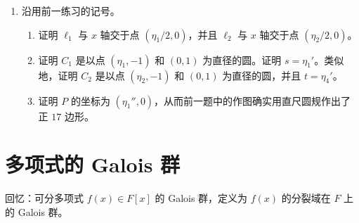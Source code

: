 \begin{enumerate}[label=\arabic*.]
\begin{enumerate}[label=(\alph*)]
\item 在点 $A$ 处作 $x$ 轴的垂线，并把从 $(0,0)$ 到 $B$ 的距离 $t$ 标出，从而作出点 $(s,t)$。作以 $(s,t)$ 和 $(0,1)$ 为直径的圆，令 $P$ 为这个圆与 $x$ 轴的右侧交点。过 $P$ 作 $x$ 轴的垂线，它与半径为 $2$ 的圆相交于正 $17$ 边形的第二个顶点，而第一个顶点取为 $(2,0)$；于是如图 4 所示，用直尺圆规作出了正 $17$ 边形。

\begin{center}
\end{center}
\end{enumerate}

\item 沿用前一练习的记号。
\begin{enumerate}[label=(\alph*)]
\item 证明 $\ell_1$ 与 $x$ 轴交于点 $(\eta_1/2,0)$，并且 $\ell_2$ 与 $x$ 轴交于点 $(\eta_2/2,0)$。

\item 证明 $C_1$ 是以点 $(\eta_1,-1)$ 和 $(0,1)$ 为直径的圆。证明 $s=\eta_1'$。类似地，证明 $C_2$ 是以点 $(\eta_2,-1)$ 和 $(0,1)$ 为直径的圆，并且 $t=\eta_4'$。

\item 证明 $P$ 的坐标为 $(\eta_1'',0)$，从而前一题中的作图确实用直尺圆规作出了正 $17$ 边形。
\end{enumerate}
\end{enumerate}

\section{多项式的 Galois 群}

回忆：可分多项式 $f(x)\in F[x]$ 的 Galois 群，定义为 $f(x)$ 的分裂域在 $F$ 上的 Galois 群。

